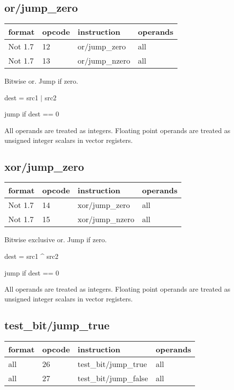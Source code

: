 \documentclass[forwardcom.tex]{subfiles}
\begin{document}
\subsection{or/jump\_zero}
\label{table:orJumpZeroInstruction}
\begin{tabular}{|p{16mm}|p{12mm}|p{60mm}|p{50mm}|}
\hline
\bfseries format & \bfseries opcode & \bfseries instruction & \bfseries operands \\ \hline
Not 1.7 & 12 & or/jump\_zero & all \\ \hline
Not 1.7 & 13 & or/jump\_nzero & all \\ \hline
\end{tabular}
\vv

Bitwise or. Jump if zero.
\vv

dest = src1 $|$ src2

jump if dest == 0
\vv

All operands are treated as integers. 
Floating point operands are treated as unsigned integer scalars in vector registers.
\vv

\subsection{xor/jump\_zero}
\label{table:xorJumpZeroInstruction}
\begin{tabular}{|p{16mm}|p{12mm}|p{60mm}|p{50mm}|}
\hline
\bfseries format & \bfseries opcode & \bfseries instruction & \bfseries operands \\ \hline
Not 1.7 & 14 & xor/jump\_zero & all \\ \hline
Not 1.7 & 15 & xor/jump\_nzero & all \\ \hline
\end{tabular}
\vv

Bitwise exclusive or. Jump if zero.
\vv

dest = src1 \^{ } src2

jump if dest == 0
\vv

All operands are treated as integers. 
Floating point operands are treated as unsigned integer scalars in vector registers.


\subsection{test\_bit/jump\_true}
\label{table:testBitJumpTrueInstruction}
\begin{tabular}{|p{16mm}|p{12mm}|p{60mm}|p{50mm}|}
\hline
\bfseries format & \bfseries opcode & \bfseries instruction & \bfseries operands \\ \hline
all & 26 & test\_bit/jump\_true & all \\ \hline
all & 27 & test\_bit/jump\_false & all \\ \hline
\end{tabular}
\vv
\end{document}
